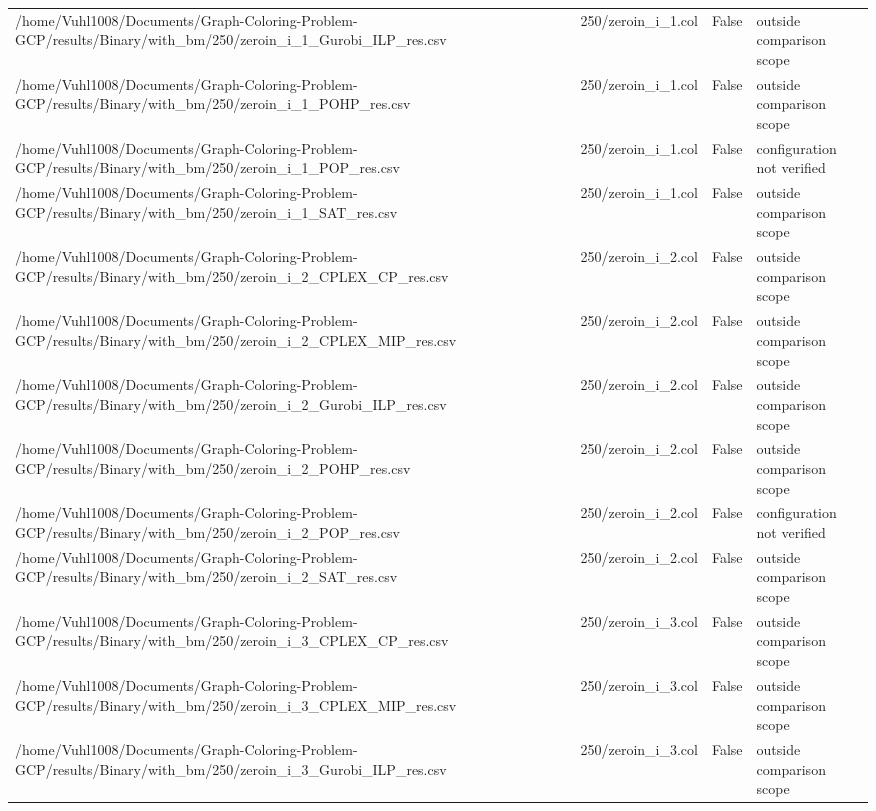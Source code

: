 \begin{table}[htbp]
\begin{tabular}{llll}
/home/Vuhl1008/Documents/Graph-Coloring-Problem-GCP/results/Binary/with\_bm/250/zeroin\_i\_1\_Gurobi\_ILP\_res.csv & 250/zeroin\_i\_1.col & False & outside comparison scope \\
/home/Vuhl1008/Documents/Graph-Coloring-Problem-GCP/results/Binary/with\_bm/250/zeroin\_i\_1\_POHP\_res.csv & 250/zeroin\_i\_1.col & False & outside comparison scope \\
/home/Vuhl1008/Documents/Graph-Coloring-Problem-GCP/results/Binary/with\_bm/250/zeroin\_i\_1\_POP\_res.csv & 250/zeroin\_i\_1.col & False & configuration not verified \\
/home/Vuhl1008/Documents/Graph-Coloring-Problem-GCP/results/Binary/with\_bm/250/zeroin\_i\_1\_SAT\_res.csv & 250/zeroin\_i\_1.col & False & outside comparison scope \\
/home/Vuhl1008/Documents/Graph-Coloring-Problem-GCP/results/Binary/with\_bm/250/zeroin\_i\_2\_CPLEX\_CP\_res.csv & 250/zeroin\_i\_2.col & False & outside comparison scope \\
/home/Vuhl1008/Documents/Graph-Coloring-Problem-GCP/results/Binary/with\_bm/250/zeroin\_i\_2\_CPLEX\_MIP\_res.csv & 250/zeroin\_i\_2.col & False & outside comparison scope \\
/home/Vuhl1008/Documents/Graph-Coloring-Problem-GCP/results/Binary/with\_bm/250/zeroin\_i\_2\_Gurobi\_ILP\_res.csv & 250/zeroin\_i\_2.col & False & outside comparison scope \\
/home/Vuhl1008/Documents/Graph-Coloring-Problem-GCP/results/Binary/with\_bm/250/zeroin\_i\_2\_POHP\_res.csv & 250/zeroin\_i\_2.col & False & outside comparison scope \\
/home/Vuhl1008/Documents/Graph-Coloring-Problem-GCP/results/Binary/with\_bm/250/zeroin\_i\_2\_POP\_res.csv & 250/zeroin\_i\_2.col & False & configuration not verified \\
/home/Vuhl1008/Documents/Graph-Coloring-Problem-GCP/results/Binary/with\_bm/250/zeroin\_i\_2\_SAT\_res.csv & 250/zeroin\_i\_2.col & False & outside comparison scope \\
/home/Vuhl1008/Documents/Graph-Coloring-Problem-GCP/results/Binary/with\_bm/250/zeroin\_i\_3\_CPLEX\_CP\_res.csv & 250/zeroin\_i\_3.col & False & outside comparison scope \\
/home/Vuhl1008/Documents/Graph-Coloring-Problem-GCP/results/Binary/with\_bm/250/zeroin\_i\_3\_CPLEX\_MIP\_res.csv & 250/zeroin\_i\_3.col & False & outside comparison scope \\
/home/Vuhl1008/Documents/Graph-Coloring-Problem-GCP/results/Binary/with\_bm/250/zeroin\_i\_3\_Gurobi\_ILP\_res.csv & 250/zeroin\_i\_3.col & False & outside comparison scope \\

\end{tabular}
\end{table}
